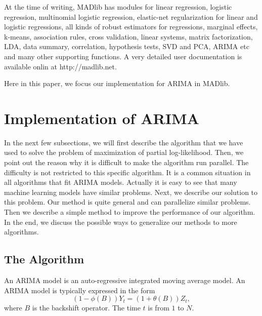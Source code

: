 \documentclass[english,12pt]{article}
\begin{document}


At the time of writing, MADlib has modules for linear regression,
logistic regression, multinomial logistic regression, elastic-net
regularization for linear and logistic regressions, all kinds of
robust estimators for regressions, marginal effects, k-means,
association rules, cross validation, linear systems, matrix
factorization, LDA, data summary, correlation, hypothesis tests, SVD
and PCA, ARIMA etc and many other supporting functions.  A very
detailed user documentation is available onlin at http://madlib.net.

Here in this paper, we focus our implementation for ARIMA in MADlib.

\section{Implementation of ARIMA}


In the next few subsections, we will first describe the algorithm that we have
used to solve the problem of maximization of partial log-likelihood. Then, we
point out the reason why it is difficult to make the algorithm run parallel.
The difficulty is not restricted to this specific algorithm. It is a
common situation in all algorithms that fit ARIMA models. Actually it is easy
to see that many machine learning models have similar problems. Next, we
describe our solution to this problem. Our method is quite general and can
parallelize similar problems. Then we describe a simple method to improve the
performance of our algorithm. In the end, we discuss the possible ways to
generalize our methods to more algorithms.

\subsection{The Algorithm}


An ARIMA model is an auto-regressive integrated moving average model. An ARIMA
model is typically expressed in the form
\begin{equation}
(1 - \phi(B)) Y_t  = (1 + \theta(B)) Z_t,
\end{equation}
where $B$ is the backshift operator. The time $t$ is from $1$ to $N$.
\end{document}
